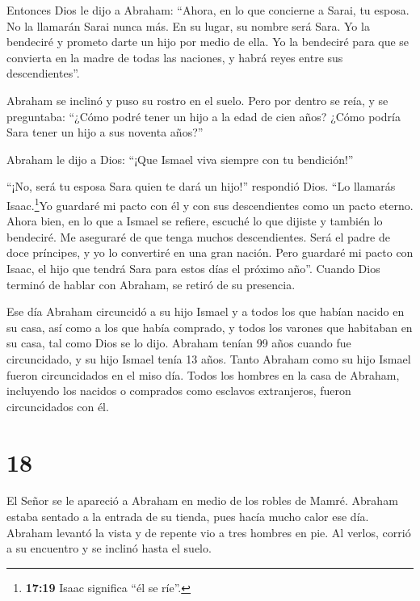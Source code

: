  Entonces Dios le dijo a Abraham: ``Ahora, en lo que
concierne a Sarai, tu esposa. No la llamarán Sarai nunca más. En su
lugar, su nombre será Sara.  Yo la bendeciré y prometo
darte un hijo por medio de ella. Yo la bendeciré para que se convierta
en la madre de todas las naciones, y habrá reyes entre sus
descendientes''.

 Abraham se inclinó y puso su rostro en el suelo. Pero por
dentro se reía, y se preguntaba: ``¿Cómo podré tener un hijo a la edad
de cien años? ¿Cómo podría Sara tener un hijo a sus noventa años?''

 Abraham le dijo a Dios: ``¡Que Ismael viva siempre con tu
bendición!''

 ``¡No, será tu esposa Sara quien te dará un hijo!''
respondió Dios. ``Lo llamarás Isaac.\footnote{\textbf{17:19} Isaac
  significa ``él se ríe''.}Yo guardaré mi pacto con él y con sus
descendientes como un pacto eterno.  Ahora bien, en lo que
a Ismael se refiere, escuché lo que dijiste y también lo bendeciré. Me
aseguraré de que tenga muchos descendientes. Será el padre de doce
príncipes, y yo lo convertiré en una gran nación.  Pero
guardaré mi pacto con Isaac, el hijo que tendrá Sara para estos días el
próximo año''.  Cuando Dios terminó de hablar con Abraham,
se retiró de su presencia.

 Ese día Abraham circuncidó a su hijo Ismael y a todos los
que habían nacido en su casa, así como a los que había comprado, y todos
los varones que habitaban en su casa, tal como Dios se lo dijo.
 Abraham tenían 99 años cuando fue circuncidado,
 y su hijo Ismael tenía 13 años.  Tanto
Abraham como su hijo Ismael fueron circuncidados en el miso día.
 Todos los hombres en la casa de Abraham, incluyendo los
nacidos o comprados como esclavos extranjeros, fueron circuncidados con
él.

\hypertarget{section-17}{%
\section{18}\label{section-17}}

 El Señor se le apareció a Abraham en medio de los robles de
Mamré. Abraham estaba sentado a la entrada de su tienda, pues hacía
mucho calor ese día.  Abraham levantó la vista y de repente
vio a tres hombres en pie. Al verlos, corrió a su encuentro y se inclinó
hasta el suelo.

